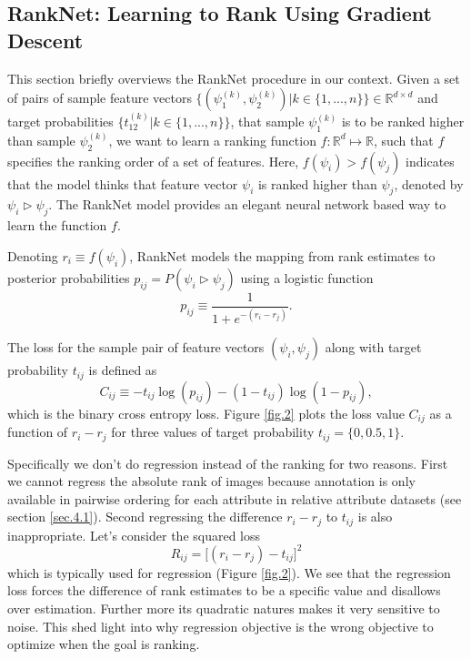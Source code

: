 \subsection{RankNet: Learning to Rank Using Gradient Descent}\label{sec3.1}
This section briefly overviews the RankNet \cite{Burges2005} procedure in our context.
Given a set of pairs of sample feature vectors $\big\{( \psi_{1}^{(k)}, \psi_{2}^{(k)} ) | k \in \{1, ...,n\} \big\} \in \mathbb{R}^{d \times d}$ and target probabilities $\big\{ t_{12}^{(k)} | k \in \{1, ...,n\} \big\}$, that sample $\psi_{1}^{(k)}$ is to be ranked higher than sample $\psi_{2}^{(k)}$, we want to learn a ranking function $f : \mathbb{R}^d \mapsto \mathbb{R}$, such that $f$ specifies the ranking order of a set of features. Here, $f(\psi_i) > f(\psi_j)$ indicates that the model thinks that feature vector $\psi_i$ is ranked higher than $\psi_j$, denoted by $\psi_i \triangleright \psi_j$. The RankNet model \cite{Burges2005} provides an elegant neural network based way to learn the function $f$.

Denoting $r_i \equiv f(\psi_i)$, RankNet models the mapping from rank estimates to posterior probabilities $p_{ij} = P(\psi_i \triangleright \psi_j)$ using a logistic function 
$$
p_{ij} \equiv \frac{1}{1 + e^{-(r_i - r_j)}}.
$$

The loss for the sample pair of feature vectors $(\psi_i, \psi_j)$ along with target probability $t_{ij}$ is defined as
$$
C_{ij} \equiv - t_{ij} \log (p_{ij}) - (1 - t_{ij}) \log (1 - p_{ij}),
$$
which is the binary cross entropy loss.
Figure \ref{fig.2} plots the loss value $C_{ij}$ as a function of $r_i - r_j$ for three values of target probability $t_{ij} = \{0, 0.5, 1\}$.

Specifically we don't do regression instead of the ranking for two reasons. First we cannot regress the absolute rank of images because annotation is only available in pairwise ordering for each attribute in relative attribute datasets (see section \ref{sec.4.1}). Second regressing the difference $r_i - r_j$ to $t_{ij}$ is also inappropriate.
Let's consider the squared loss
$$
R_{ij} = \big[(r_i - r_j) - t_{ij}\big]^2
$$
which is typically used for regression (Figure \ref{fig.2}). We see that the regression loss forces the difference of rank estimates to be a specific value and disallows over estimation. Further more its quadratic natures makes it very sensitive to noise. This shed light into why regression objective is the wrong objective to optimize when the goal is ranking.

